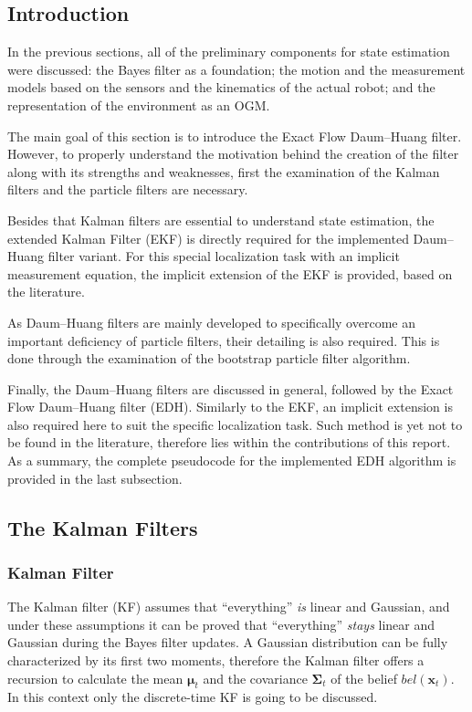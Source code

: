 \subsection{Introduction}

In the previous sections, all of the preliminary components for
state estimation were discussed:
the Bayes filter as a foundation;
the motion and the measurement models based on the
sensors and the kinematics of the actual robot;
and the representation of the environment as an OGM.

The main goal of this section is to introduce the Exact Flow Daum--Huang filter. However, to properly understand the motivation behind
the creation of the filter along with its strengths and weaknesses, first the
examination of the Kalman filters and the particle filters are necessary.

Besides that Kalman filters are essential to understand state estimation,
the extended Kalman Filter (EKF) is directly required for the implemented Daum--Huang filter variant. For this special localization task with
an implicit measurement equation, the implicit extension of the EKF is provided, based on the literature.

As Daum--Huang filters are mainly developed to specifically overcome
an important deficiency of particle filters, their detailing is
also required. This is done through the examination of the bootstrap particle filter algorithm.

Finally, the Daum--Huang filters are discussed in general,
followed by the Exact Flow Daum--Huang filter (EDH). Similarly to the EKF,
an implicit extension is also required here to suit the
specific localization task. Such method is  yet not to be found in the literature, therefore lies within the contributions
of this report. As a summary, the complete pseudocode for the implemented EDH algorithm is provided in the last subsection.
\subsection{The Kalman Filters}
\subsubsection{Kalman Filter}
The Kalman filter (KF) assumes that ``everything'' \emph{is} linear and Gaussian,
and under these assumptions it can be proved that ``everything'' \emph{stays} linear and Gaussian during the Bayes filter updates.
A Gaussian distribution can be fully characterized by its first two moments,
therefore the Kalman filter offers a recursion to calculate the mean $\boldsymbol{\mu}_t$ and the covariance $\mathbf{\Sigma}_t$ of the belief $bel(\mathbf{x}_t)$.
In this context only the discrete-time KF is going to be discussed.


